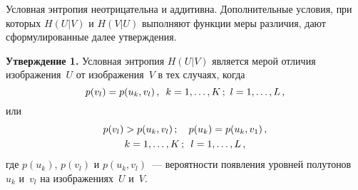 \begin{multicols}{2}
  Условная энтропия неотрицательна и аддитивна. Дополнительные условия, при которых 
$H(U\vert V)$ и $H(V\vert U)$ выполняют функции меры различия, дают сформулированные 
далее утверждения. 

\medskip

\noindent
\textbf{Утверждение 1.} Условная энтропия $H(U\vert V)$ является мерой отличия 
изображения~$U$ от изображения~$V$ в тех случаях, когда
\begin{equation}
p(v_l)=p(u_k,v_l)\,,\enskip k=1, \ldots , K\,;\ l=1, \ldots ,L\,,
\label{e4mur}
\end{equation}
или
\begin{multline}
p(v_l)>p(u_k,v_l)\,;\quad p(u_k)=p(u_k,v_1)\,,\\
k=1, \ldots , K\,;\enskip l=1, \ldots ,L\,,
\label{e5mur}
\end{multline}
где $p(u_k)$, $p(v_l)$ и $p(u_k,v_l)$~--- вероятности появления уровней полутонов~$u_k$ 
и~$v_l$ на изображениях~$U$ и~$V$.

      \begin{figure*} %
       \vspace*{1pt}
       \begin{minipage}[t]{80mm}
 \begin{center}
 \mbox{%
 \epsfxsize=78.099mm
 }
 \end{center}
 \vspace*{-9pt}
\end{minipage}
\hfill
       \vspace*{1pt}
       \begin{minipage}[t]{80mm}
 \begin{center}
 \mbox{%
 \epsfxsize=78.455mm
 }
 \end{center}
 \vspace*{-9pt}
\end{minipage}
\vspace*{6pt}
\end{figure*}

\begin{figure*}[b] %
       \vspace*{6pt}
 \begin{center}
 \mbox{%
 \epsfxsize=150.06mm
 }
 \end{center}
 \vspace*{-9pt}
\end{figure*}


\end{multicols}
